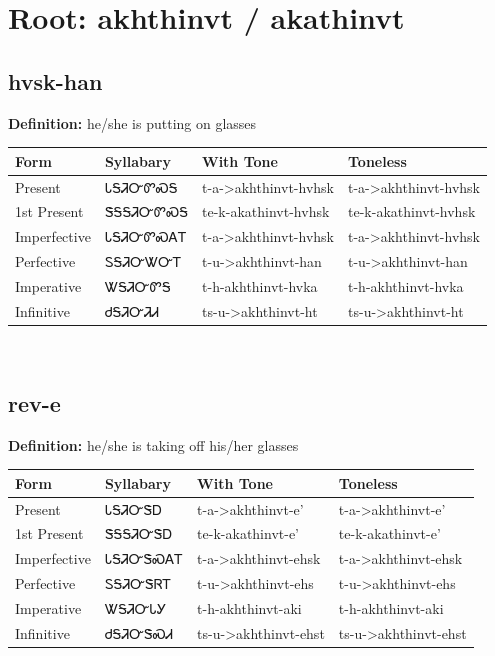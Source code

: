 \documentclass{article}%
\begin{document}
%
\normalsize%
\section*{Root: akhthinvt / akathinvt}%
\subsection*{hvsk-han}%
\textbf{Definition: }%
he/she is putting on glasses%
\\[0.5em]%
\begin{tabular}{|l|l|l|l|}%
\hline%
\textbf{Form}&\textbf{Syllabary}&\textbf{With Tone}&\textbf{Toneless}\\%
\hline%
Present&ᏓᎦᏘᏅᏛᏍᎦ&t{-}a{-}>akhthinvt{-}hvhsk&t{-}a{-}>akhthinvt{-}hvhsk\\%
1st Present&ᏕᎦᎦᏘᏅᏛᏍᎦ&te{-}k{-}akathinvt{-}hvhsk&te{-}k{-}akathinvt{-}hvhsk\\%
Imperfective&ᏓᎦᏘᏅᏛᏍᎪᎢ&t{-}a{-}>akhthinvt{-}hvhsk&t{-}a{-}>akhthinvt{-}hvhsk\\%
Perfective&ᏚᎦᏘᏅᏔᏅᎢ&t{-}u{-}>akhthinvt{-}han&t{-}u{-}>akhthinvt{-}han\\%
Imperative&ᏔᎦᏘᏅᏛᎦ&t{-}h{-}akhthinvt{-}hvka&t{-}h{-}akhthinvt{-}hvka\\%
Infinitive&ᏧᎦᏘᏅᏘᏗ&ts{-}u{-}>akhthinvt{-}ht&ts{-}u{-}>akhthinvt{-}ht\\%
\hline%
\end{tabular}%
\\[1em]%
\subsection*{rev-e}%
\textbf{Definition: }%
he/she is taking off his/her glasses%
\\[0.5em]%
\begin{tabular}{|l|l|l|l|}%
\hline%
\textbf{Form}&\textbf{Syllabary}&\textbf{With Tone}&\textbf{Toneless}\\%
\hline%
Present&ᏓᎦᏘᏅᏕᎠ&t{-}a{-}>akhthinvt{-}e'&t{-}a{-}>akhthinvt{-}e'\\%
1st Present&ᏕᎦᎦᏘᏅᏕᎠ&te{-}k{-}akathinvt{-}e'&te{-}k{-}akathinvt{-}e'\\%
Imperfective&ᏓᎦᏘᏅᏕᏍᎪᎢ&t{-}a{-}>akhthinvt{-}ehsk&t{-}a{-}>akhthinvt{-}ehsk\\%
Perfective&ᏚᎦᏘᏅᏕᏒᎢ&t{-}u{-}>akhthinvt{-}ehs&t{-}u{-}>akhthinvt{-}ehs\\%
Imperative&ᏔᎦᏘᏅᏓᎩ&t{-}h{-}akhthinvt{-}aki&t{-}h{-}akhthinvt{-}aki\\%
Infinitive&ᏧᎦᏘᏅᏕᏍᏗ&ts{-}u{-}>akhthinvt{-}ehst&ts{-}u{-}>akhthinvt{-}ehst\\%
\hline%
\end{tabular}%
\\[1em]%
\end{document}
